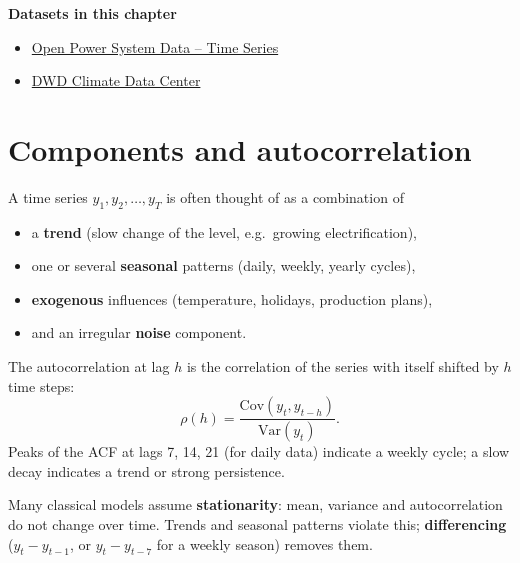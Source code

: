 \documentclass[
  letterpaper,
  DIV=11,
  numbers=noendperiod]{scrreprt}
\providecommand{\tightlist}{%
  \setlength{\itemsep}{0pt}\setlength{\parskip}{0pt}}\usepackage{longtable,booktabs,array}
\begin{document}
\textbf{Datasets in this chapter}

\begin{itemize}
\tightlist
\item
  \href{https://data.open-power-system-data.org/time_series/}{Open Power
  System Data -- Time Series}
\item
  \href{https://opendata.dwd.de/climate_environment/CDC/}{DWD Climate
  Data Center}
\end{itemize}

\section{Components and
autocorrelation}\label{components-and-autocorrelation}

A time series \(y_1, y_2, \dots, y_T\) is often thought of as a
combination of

\begin{itemize}
\tightlist
\item
  a \textbf{trend} (slow change of the level, e.g.~growing
  electrification),
\item
  one or several \textbf{seasonal} patterns (daily, weekly, yearly
  cycles),
\item
  \textbf{exogenous} influences (temperature, holidays, production
  plans),
\item
  and an irregular \textbf{noise} component.
\end{itemize}

\begin{tcolorbox}[enhanced jigsaw, left=2mm, title=\textcolor{quarto-callout-note-color}{\faInfo}\hspace{0.5em}{Definition: Autocorrelation function (ACF)}, opacityback=0, breakable, rightrule=.15mm, arc=.35mm, toptitle=1mm, colbacktitle=quarto-callout-note-color!10!white, opacitybacktitle=0.6, coltitle=black, colframe=quarto-callout-note-color-frame, bottomrule=.15mm, leftrule=.75mm, bottomtitle=1mm, titlerule=0mm, toprule=.15mm, colback=white]

The autocorrelation at lag \(h\) is the correlation of the series with
itself shifted by \(h\) time steps:
\[\rho(h) = \frac{\text{Cov}(y_t, y_{t-h})}{\text{Var}(y_t)}.\] Peaks of
the ACF at lags 7, 14, 21 (for daily data) indicate a weekly cycle; a
slow decay indicates a trend or strong persistence.

\end{tcolorbox}

Many classical models assume \textbf{stationarity}: mean, variance and
autocorrelation do not change over time. Trends and seasonal patterns
violate this; \textbf{differencing} (\(y_t - y_{t-1}\), or
\(y_t - y_{t-7}\) for a weekly season) removes them.
\end{document}
